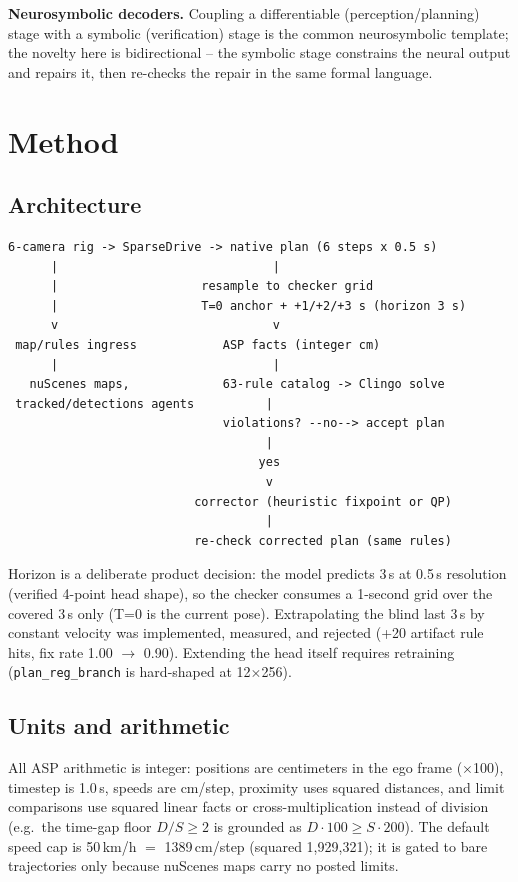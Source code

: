 \documentclass[11pt]{article}
\begin{document}
\textbf{Neurosymbolic decoders.} Coupling a differentiable
(perception/planning) stage with a symbolic (verification) stage is
the common neurosymbolic template; the novelty here is bidirectional
-- the symbolic stage constrains the neural output and repairs it,
then re-checks the repair in the same formal language.

\section{Method}
\label{sec:method}

\subsection{Architecture}

\begin{verbatim}
6-camera rig -> SparseDrive -> native plan (6 steps x 0.5 s)
      |                              |
      |                    resample to checker grid
      |                    T=0 anchor + +1/+2/+3 s (horizon 3 s)
      v                              v
 map/rules ingress            ASP facts (integer cm)
      |                              |
   nuScenes maps,             63-rule catalog -> Clingo solve
 tracked/detections agents          |
                              violations? --no--> accept plan
                                    |
                                   yes
                                    v
                          corrector (heuristic fixpoint or QP)
                                    |
                          re-check corrected plan (same rules)
\end{verbatim}

Horizon is a deliberate product decision: the model predicts 3\,s at
0.5\,s resolution (verified 4-point head shape), so the checker
consumes a 1-second grid over the covered 3\,s only (T=0 is the
current pose). Extrapolating the blind last 3\,s by constant
velocity was implemented, measured, and rejected (+20 artifact rule
hits, fix rate 1.00 $\to$ 0.90). Extending the head itself requires
retraining (\texttt{plan\_reg\_branch} is hard-shaped at 12$\times$256).

\subsection{Units and arithmetic}
All ASP arithmetic is integer: positions are centimeters in the ego
frame ($\times$100), timestep is 1.0\,s, speeds are
cm/step, proximity uses squared distances, and limit comparisons use
squared linear facts or cross-multiplication instead of division
(e.g.\ the time-gap floor $D/S \ge 2$ is grounded as $D\cdot 100 \ge
S\cdot 200$). The default speed cap is 50\,km/h $=$ 1389\,cm/step
(squared 1{,}929{,}321); it is gated to bare trajectories only
because nuScenes maps carry no posted limits.
\end{document}
